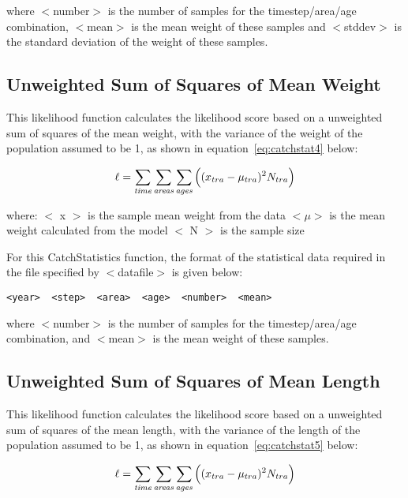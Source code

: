 \documentclass[10pt,twoside]{book}
\begin{document}
where $<$number$>$ is the number of samples for the timestep/area/age combination, $<$mean$>$ is the mean weight of these samples and $<$stddev$>$ is the standard deviation of the weight of these samples.

\subsection{Unweighted Sum of Squares of Mean Weight}
This likelihood function calculates the likelihood score based on a unweighted sum of squares of the mean weight, with the variance of the weight of the population assumed to be 1, as shown in equation~\ref{eq:catchstat4} below:

\begin{equation}\label{eq:catchstat4}
\ell = \sum_{\it time}\sum_{\it areas}\sum_{\it ages} \Big((x_{tra}-\mu_{tra})^2 N_{tra}\Big)
\end{equation}

where:\newline
$<$ x $>$ is the sample mean weight from the data\newline
$<\mu>$ is the mean weight calculated from the model\newline
$<$ N $>$ is the sample size

\bigskip
For this CatchStatistics function, the format of the statistical data required in the file specified by $<$datafile$>$ is given below:

{\small\begin{verbatim}
<year>  <step>  <area>  <age>  <number>  <mean>
\end{verbatim}}

where $<$number$>$ is the number of samples for the timestep/area/age combination, and $<$mean$>$ is the mean weight of these samples.

\subsection{Unweighted Sum of Squares of Mean Length}
This likelihood function calculates the likelihood score based on a unweighted sum of squares of the mean length, with the variance of the length of the population assumed to be 1, as shown in equation~\ref{eq:catchstat5} below:

\begin{equation}\label{eq:catchstat5}
\ell = \sum_{\it time}\sum_{\it areas}\sum_{\it ages} \Big((x_{tra}-\mu_{tra})^2 N_{tra}\Big)
\end{equation}
\end{document}
